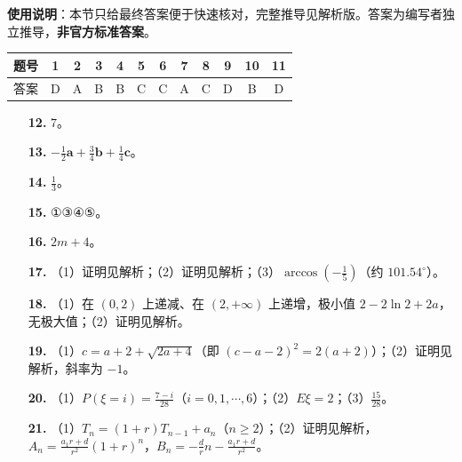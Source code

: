 
\begin{gknotice}
\textbf{使用说明}：本节只给最终答案便于快速核对，完整推导见解析版。答案为编写者独立推导，\textbf{非官方标准答案}。
\end{gknotice}

\begin{center}\begin{tabular}{cccccccccccc}
\toprule
题号 & 1 & 2 & 3 & 4 & 5 & 6 & 7 & 8 & 9 & 10 & 11 \\
\midrule
答案 & D & A & B & B & C & C & A & C & D & B & D \\
\bottomrule
\end{tabular}\end{center}

\begin{itemize}[leftmargin=2.6em]
  \item[\textbf{12.}] $7$。
  \item[\textbf{13.}] $-\frac12\boldsymbol a+\frac34\boldsymbol b+\frac14\boldsymbol c$。
  \item[\textbf{14.}] $\frac13$。
  \item[\textbf{15.}] ①③④⑤。
\end{itemize}

\begin{itemize}[leftmargin=2.6em]
  \item[\textbf{16.}] $2m+4$。
  \item[\textbf{17.}] （1）证明见解析；（2）证明见解析；（3）$\arccos\left(-\frac15\right)$（约 $101.54^\circ$）。
  \item[\textbf{18.}] （1）在 $(0,2)$ 上递减、在 $(2,+\infty)$ 上递增，极小值 $2-2\ln2+2a$，无极大值；（2）证明见解析。
  \item[\textbf{19.}] （1）$c=a+2+\sqrt{2a+4}$（即 $(c-a-2)^2=2(a+2)$）；（2）证明见解析，斜率为 $-1$。
  \item[\textbf{20.}] （1）$P(\xi=i)=\frac{7-i}{28}$（$i=0,1,\cdots,6$）；（2）$E\xi=2$；（3）$\frac{15}{28}$。
  \item[\textbf{21.}] （1）$T_n=(1+r)T_{n-1}+a_n$（$n\geqslant2$）；（2）证明见解析，$A_n=\frac{a_1r+d}{r^2}(1+r)^n$，$B_n=-\frac drn-\frac{a_1r+d}{r^2}$。
\end{itemize}
